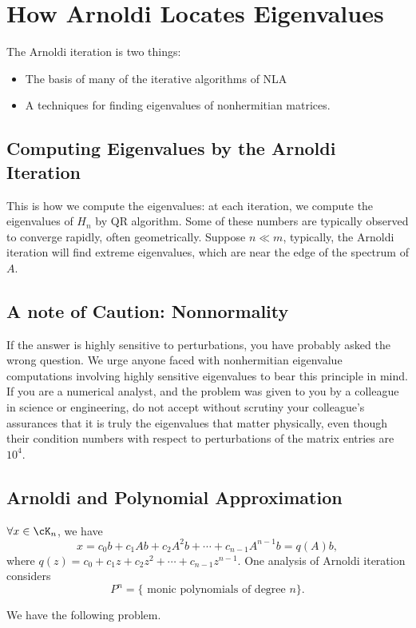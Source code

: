 \chapter{How Arnoldi Locates Eigenvalues}
The Arnoldi iteration is two things:
\begin{itemize}
    \item The basis of many of the iterative algorithms of NLA 
    \item A techniques for finding eigenvalues of nonhermitian matrices. 
\end{itemize} 

\section{Computing Eigenvalues by the Arnoldi Iteration} 

This is how we compute the eigenvalues: at each iteration, we compute the eigenvalues of $ H_n $ by QR algorithm. Some of these numbers are typically observed to converge rapidly, often geometrically. Suppose $n\ll m$, typically, the Arnoldi iteration will find extreme eigenvalues, which are near the edge of the spectrum of $ A $. 

\section{ A note of Caution: Nonnormality} 
If the answer is highly sensitive to perturbations, you have probably asked the wrong question. We urge anyone faced with nonhermitian eigenvalue computations involving highly sensitive eigenvalues to bear this principle in mind. If you are a numerical analyst, and the problem was given to you by a colleague in science or engineering, do not accept without scrutiny your colleague's assurances that it is truly the eigenvalues that matter physically, even though their condition numbers with respect to perturbations of the matrix entries are $10^4$. 

\section{ Arnoldi and Polynomial Approximation} 
$ \forall x \in \cK_n $, we have 
\[
    x = c_0b+c_1Ab+c_2A^{2} b + \cdots +c_{ n-1 } A^{n-1}b = q(A)b, 
\]
where $ q(z) = c_0 +c_1z +c_2 z^{2} +\cdots + c_{n-1}z^{n-1} $.  One analysis of Arnoldi iteration considers 
\[
    P^{n} = \{\text{ monic polynomials of degree }n\} .
\]

We have the following problem. 


